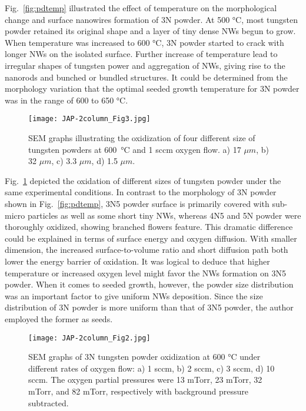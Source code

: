 Fig.~\ref{fig:pdtemp} illustrated the effect of temperature on the morphological change and surface nanowires formation of 3N powder. At 500 \si{\degreeCelsius}, most tungsten powder retained its original shape and a layer of tiny dense NWs begun to grow. When temperature was increased to 600 \si{\degreeCelsius}, 3N powder started to crack with longer NWs on the isolated surface. Further increase of temperature lead to irregular shapes of tungsten power and aggregation of NWs, giving rise to the nanorods and bunched or bundled structures. It could be determined from the morphology variation that the optimal seeded growth temperature for 3N powder was in the range of 600 to 650 \si{\degreeCelsius}.
\begin{figure}[htb]
\centering
\texttt{[image: JAP-2column\_Fig3.jpg]}
\caption[W powder oxidation: size effect]{SEM graphs illustrating the oxidization of four different size of tungsten powders at 600~\si{\degreeCelsius} and 1 sccm oxygen flow. a) 17 $\mu m$, b) 32 $\mu m$, c) 3.3 $\mu m$, d) 1.5 $\mu m$.}
\label{fig:pdsize}
\end{figure}

Fig.~\ref{fig:pdsize} depicted the oxidation of different sizes of tungsten powder under the same experimental conditions. In contrast to the morphology of 3N powder shown in Fig.~\ref{fig:pdtemp}, 3N5 powder surface is primarily covered with sub-micro particles as well as some short tiny NWs, whereas 4N5 and 5N powder were thoroughly oxidized, showing branched flowers feature. This dramatic difference could be explained in terms of surface energy and oxygen diffusion. With smaller dimension, the increased surface-to-volume ratio and short diffusion path both lower the energy barrier of oxidation.\cite{tungsten1999} It was logical to deduce that higher temperature or increased oxygen level might favor the NWs formation on 3N5 powder. When it comes to seeded growth, however, the powder size distribution was an important factor to give uniform NWs deposition. Since the size distribution of 3N powder is more uniform than that of 3N5 powder, the author employed the former as seeds.
\begin{figure}[htb]
\centering
\texttt{[image: JAP-2column\_Fig2.jpg]}
\caption[W powder oxidation: oxygen pressure]{SEM graphs of 3N tungsten powder oxidization at 600 \si{\degreeCelsius} under different rates of oxygen flow: a) 1 sccm, b) 2 sccm, c) 3 sccm, d) 10 sccm. The oxygen partial pressures were 13 mTorr, 23 mTorr, 32 mTorr, and 82 mTorr, respectively with background pressure subtracted.}
\label{fig:pdoxy}
\end{figure}

